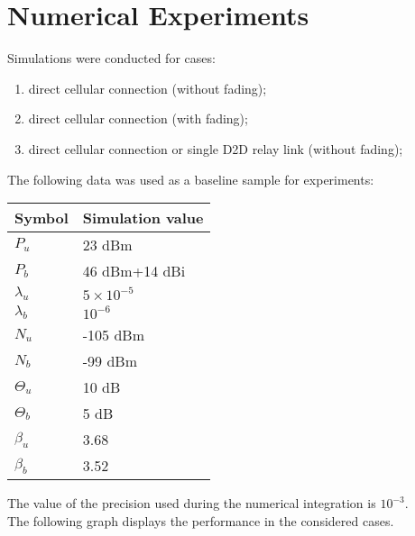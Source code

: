 \section{Numerical Experiments}
Simulations were conducted for cases:
\begin{enumerate}
    \item direct cellular connection (without fading);
    \item direct cellular connection (with fading);
	\item direct cellular connection or single D2D relay link (without fading);
\end{enumerate}
The following data was used as a baseline sample for experiments:
\begin{center}
    \begin{tabular}{ | l | p{3cm} | }
	  \hline
	  Symbol & Simulation value \\
	  \hline
	  ${P_u}$ & 23 dBm\\
	  ${P_b}$ & 46 dBm+14 dBi\\
	  ${\lambda_u}$ & ${5\times 10^{-5}}$\\
	  ${\lambda_b}$ & $10^{-6}$\\
	  ${N_u}$ & -105 dBm\\
	  ${N_b}$ & -99 dBm\\
	  ${\Theta_u}$ & 10 dB\\
	  ${\Theta _b}$ & 5 dB\\
	  ${\beta_u}$ & 3.68\\
	  ${\beta_b}$ & 3.52\\
	  \hline
	\end{tabular}
\end{center}
The value of the precision used during the numerical integration is $10^{-3}$.
\\ The following graph displays the performance in the considered cases.

\vspace{1.5em}

